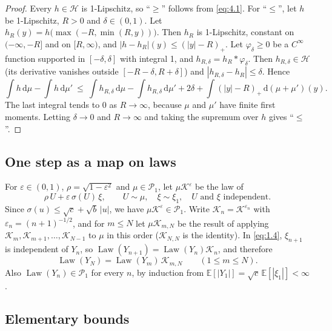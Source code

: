 \documentclass[aip,jmp,preprint,onecolumn,floatfix,superscriptaddress,nofootinbib,11pt]{revtex4-2}
\theoremstyle{plain}
\theoremstyle{remark}
\numberwithin{equation}{section}
\newcommand{\dd}{\mathrm{d}}
\newcommand{\E}{\mathbb{E}}
\newcommand{\eps}{\varepsilon}
\newcommand{\Law}{\operatorname{Law}}
\begin{document}
\begin{proof} Every $h\in\mathcal H$ is 1-Lipschitz, so ``$\ge$'' follows from \eqref{eq:4.1}. For ``$\le$'', let $h$ be 1-Lipschitz, $R>0$ and $\delta\in(0,1)$. Let $h_R(y)=h\big(\max(-R,\min(R,y))\big)$. Then $h_R$ is 1-Lipschitz, constant on $(-\infty,-R]$ and on $[R,\infty)$, and $|h-h_R|(y)\le(|y|-R)_+$. Let $\varphi_\delta\ge0$ be a $C^\infty$ function supported in $[-\delta,\delta]$ with integral 1, and $h_{R,\delta}=h_R*\varphi_\delta$. Then $h_{R,\delta}\in\mathcal H$ (its derivative vanishes outside $[-R-\delta,R+\delta]$) and $|h_{R,\delta}-h_R|\le\delta$. Hence
%
\begin{equation*}
\int h\,\dd\mu-\int h\,\dd\mu'\ \le\ \int h_{R,\delta}\,\dd\mu-\int h_{R,\delta}\,\dd\mu'+2\delta+\int(|y|-R)_+\,\dd(\mu+\mu')(y).
\end{equation*}
%
The last integral tends to $0$ as $R\to\infty$, because $\mu$ and $\mu'$ have finite first moments. Letting $\delta\to0$ and $R\to\infty$ and taking the supremum over $h$ gives ``$\le$''. 
\end{proof}
 
\subsection{One step as a map on laws}\label{sec:4_2}
 
For $\eps\in(0,1)$, $\rho=\sqrt{1-\eps^{2}}$ and $\mu\in\mathcal P_1$, let $\mu \mathcal K^{\eps}$ be the law of
%
\begin{equation}
\rho\,U+\eps\,\sigma(U)\,\xi,\qquad U\sim\mu,\quad \xi\sim\xi_1,\quad U\text{ and }\xi\text{ independent}.
\label{eq:4.2}
\end{equation}
%
Since $\sigma(u)\le\sqrt c+\sqrt b\,|u|$, we have $\mu \mathcal K^{\eps}\in\mathcal P_1$. Write $\mathcal K_n=\mathcal K^{\eps_n}$ with $\eps_n=(n+1)^{-1/2}$, and for $m\le N$ let $\mu \mathcal K_{m,N}$ be the result of applying $\mathcal K_m,\mathcal K_{m+1},\dots,\mathcal K_{N-1}$ to $\mu$ in this order ($\mathcal K_{N,N}$ is the identity). In \eqref{eq:1.4}, $\xi_{n+1}$ is independent of $Y_n$, so $\Law(Y_{n+1})=\Law(Y_n)\mathcal K_n$, and therefore
%
\begin{equation}
\Law(Y_N)=\Law(Y_m)\,\mathcal K_{m,N}\qquad(1\le m\le N).
\label{eq:4.3}
\end{equation}
%
Also $\Law(Y_n)\in\mathcal P_1$ for every $n$, by induction from $\E[|Y_1|]=\sqrt c\,\E[|\xi_1|]<\infty$.
 
\subsection{Elementary bounds}\label{sec:4_3}
 
\end{document}
